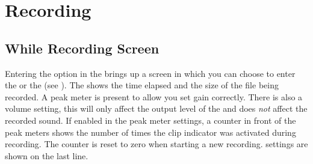 \section{\label{ref:Recording}Recording}
\subsection{\label{ref:while_recording_screen}While Recording Screen}

Entering the  option in the  brings up
a screen in which you can choose to enter the  or
the  (see ). 
The 
shows the time elapsed and the size of the file being recorded. A peak meter
is present to allow you set gain correctly. There is also a volume setting,
this will only affect the output level of the \dap{} and does \emph{not}
affect the recorded sound. If enabled in the peak meter settings, a counter in
front of the peak meters shows the number of times the clip indicator was
activated during recording. The counter is reset to zero when starting a new
recording.
 settings are shown on the last line.

